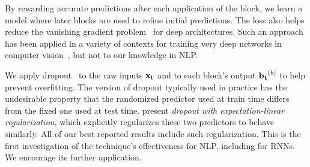 By rewarding accurate predictions after each application of the block, we learn a model where later blocks are used to refine initial predictions. The loss also helps reduce the vanishing gradient problem~\citep{hochreiter1998vanishing} for deep architectures. Such an approach has been applied in a variety of contexts for training very deep networks in computer vision~\citep{romero2014fitnets,szegedy2015going,lee2015deeply,gulccehre2016knowledge}, but not to our knowledge in NLP.

We apply dropout~\citep{srivastava2014dropout} to the raw inputs ${\bf x_t}$ and to each block's output ${\bf b_t}^{(b)}$ to help prevent overfitting. The version of dropout typically used in practice has the undesirable property that the randomized predictor used at train time differs from the fixed one used at test time. \citet{ma2017dropout} present \textit{dropout with expectation-linear regularization}, which explicitly regularizes these two predictors to behave similarly. All of our best reported results include such regularization. This is the first investigation of the technique's effectiveness for NLP, including for RNNs. We encourage its further application.

